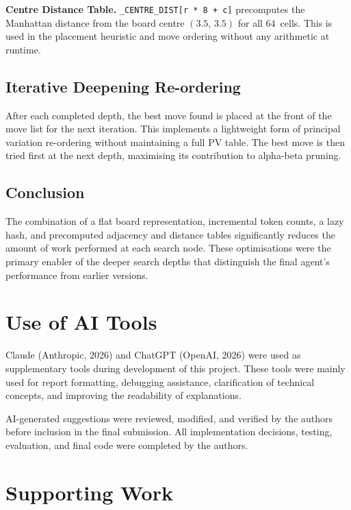\documentclass[10.5pt,a4paper]{article}
\begin{document}
\textbf{Centre Distance Table.}
\texttt{\_CENTRE\_DIST[r * 8 + c]} precomputes the Manhattan distance from the board centre $(3.5,\,3.5)$ for all 64~cells. This is used in the placement heuristic and move ordering without any arithmetic at runtime.

\subsection{Iterative Deepening Re-ordering}

After each completed depth, the best move found is placed at the front of the move list for the next iteration. This implements a lightweight form of principal variation re-ordering without maintaining a full PV table. The best move is then tried first at the next depth, maximising its contribution to alpha-beta pruning.

\subsection{Conclusion}

The combination of a flat board representation, incremental token counts, a lazy hash, and precomputed adjacency and distance tables significantly reduces the amount of work performed at each search node. These optimisations were the primary enabler of the deeper search depths that distinguish the final agent's performance from earlier versions.

\section{Use of AI Tools}

Claude (Anthropic, 2026) and ChatGPT (OpenAI, 2026) were used as supplementary tools during development of this project. These tools were mainly used for report formatting, debugging assistance, clarification of technical concepts, and improving the readability of explanations.

AI-generated suggestions were reviewed, modified, and verified by the authors before inclusion in the final submission. All implementation decisions, testing, evaluation, and final code were completed by the authors.

\section{Supporting Work}
\label{sec:supporting}
\end{document}
